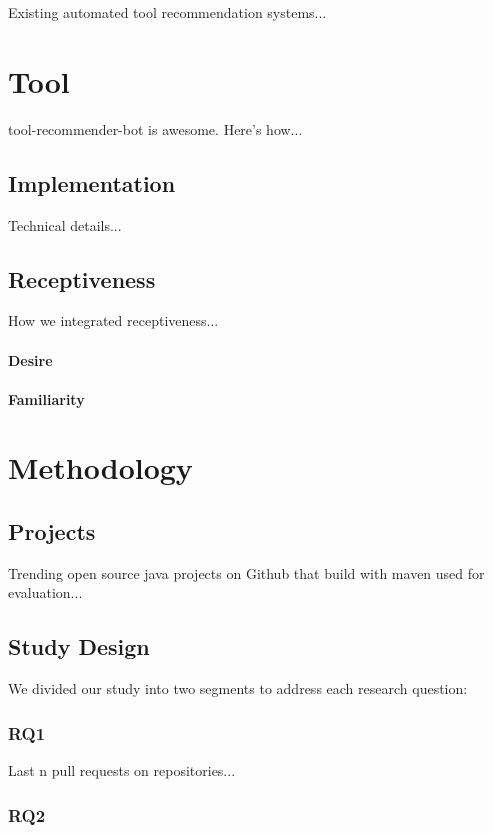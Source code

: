 \documentclass[conference]{IEEEtran}
\newcommand{\tool}{tool-recommender-bot }
\begin{document}
Existing automated tool recommendation systems...

\section{Tool}
\tool is awesome. Here's how...

\subsection{Implementation}
Technical details...

\subsection{Receptiveness}
How we integrated receptiveness...

\paragraph{Desire}

\paragraph{Familiarity}

\section{Methodology}

\subsection{Projects}

Trending open source java projects on Github that build with maven used for evaluation...

\subsection{Study Design}

We divided our study into two segments to address each research question:

\subsubsection{RQ1}

Last n pull requests on repositories...

\subsubsection{RQ2}
\end{document}
